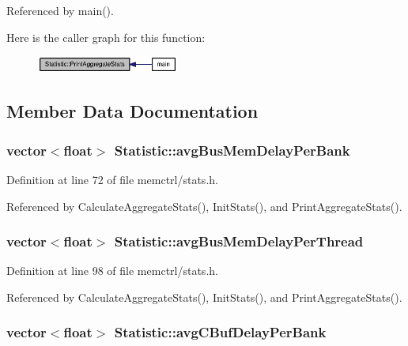 Referenced by main().

Here is the caller graph for this function:\nopagebreak
\begin{figure}[H]
\begin{center}
\leavevmode
\includegraphics[width=132pt]{classStatistic_fba2d32119e3a6da2f56aaee19944cf6_icgraph}
\end{center}
\end{figure}


\subsection{Member Data Documentation}
\subsubsection[{avgBusMemDelayPerBank}]{\setlength{\rightskip}{0pt plus 5cm}vector$<$float$>$ {\bf Statistic::avgBusMemDelayPerBank}}\label{classStatistic_51eed213cdd1ed75e43d63a17e12edd9}




Definition at line 72 of file memctrl/stats.h.

Referenced by CalculateAggregateStats(), InitStats(), and PrintAggregateStats().
\subsubsection[{avgBusMemDelayPerThread}]{\setlength{\rightskip}{0pt plus 5cm}vector$<$float$>$ {\bf Statistic::avgBusMemDelayPerThread}}\label{classStatistic_32222891516aea41f7812234f911b39b}




Definition at line 98 of file memctrl/stats.h.

Referenced by CalculateAggregateStats(), InitStats(), and PrintAggregateStats().
\subsubsection[{avgCBufDelayPerBank}]{\setlength{\rightskip}{0pt plus 5cm}vector$<$float$>$ {\bf Statistic::avgCBufDelayPerBank}}\label{classStatistic_b741691627211b72698a41d646aaaad1}




